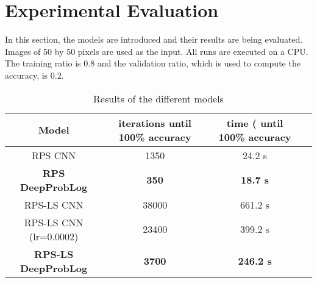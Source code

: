 \section{Experimental Evaluation}
In this section, the models are introduced and their results are being evaluated. Images of 50 by 50 pixels are used as the input. All runs are executed on a CPU. The training ratio is 0.8 and the validation ratio, which is used to compute the accuracy, is 0.2.







\begin{table}[h]
    \centering
    \begin{tabular}{|c|c|c|c|}
        \hline
        Model & iterations until 100\% accuracy  & time ( until 100\% accuracy    \\
        \hline\hline
        RPS CNN & 1350 & 24.2 s \\
        \hline
        \textbf{RPS DeepProbLog} & \textbf{350} & \textbf{18.7 s} \\
        \hline
        \hline
        RPS-LS CNN & 38000 & 661.2 s\\
        \hline
        RPS-LS CNN (lr=0.0002)& 23400 & 399.2 s\\
        \hline
        \textbf{RPS-LS DeepProbLog} & \textbf{3700} & \textbf{246.2 s}\\
        \hline
    \end{tabular}
    \caption{Results of the different models}
    \label{t1}
    \end{table}